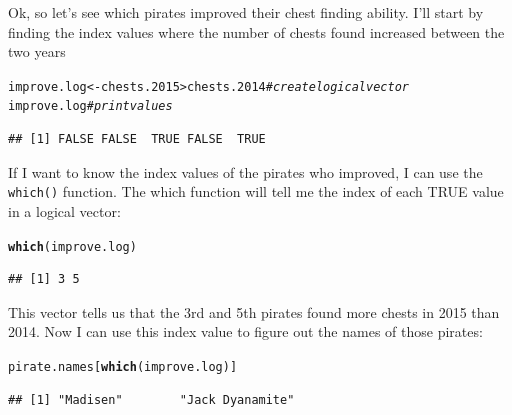 \documentclass{tufte-book}\usepackage[]{graphicx}\usepackage[]{color}
\makeatletter
\newcommand{\hlcom}[1]{\textcolor[rgb]{0.678,0.584,0.686}{\textit{#1}}}%
\newcommand{\hlopt}[1]{\textcolor[rgb]{0,0,0}{#1}}%
\newcommand{\hlstd}[1]{\textcolor[rgb]{0.345,0.345,0.345}{#1}}%
\newcommand{\hlkwb}[1]{\textcolor[rgb]{0.69,0.353,0.396}{#1}}%
\newcommand{\hlkwd}[1]{\textcolor[rgb]{0.737,0.353,0.396}{\textbf{#1}}}%
\newenvironment{kframe}{%
 \def\at@end@of@kframe{}%
 \ifinner\ifhmode%
  \def\at@end@of@kframe{\end{minipage}}%
  \begin{minipage}{\columnwidth}%
 \fi\fi%
 \def\FrameCommand##1{\hskip\@totalleftmargin \hskip-\fboxsep
 \colorbox{shadecolor}{##1}\hskip-\fboxsep
     \hskip-\linewidth \hskip-\@totalleftmargin \hskip\columnwidth}%
 \MakeFramed {\advance\hsize-\width
   \@totalleftmargin\z@ \linewidth\hsize
   \@setminipage}}%
 {\par\unskip\endMakeFramed%
 \at@end@of@kframe}
\newenvironment{knitrout}{}{} %
\makeatother
\begin{document}
\begin{footnotesize}
Ok, so let's see which pirates improved their chest finding ability. I'll start by finding the index values where the number of chests found increased between the two years

\begin{footnotesize}
\begin{knitrout}
\color{fgcolor}\begin{kframe}
\begin{alltt}
\hlstd{improve.log} \hlkwb{<-} \hlstd{chests.2015} \hlopt{>} \hlstd{chests.2014} \hlcom{# create logical vector}
\hlstd{improve.log} \hlcom{# print values}
\end{alltt}
\begin{verbatim}
## [1] FALSE FALSE  TRUE FALSE  TRUE
\end{verbatim}
\end{kframe}
\end{knitrout}
\end{footnotesize}

If I want to know the index values of the pirates who improved, I can use the \texttt{which()} function. The which function will tell me the index of each TRUE value in a logical vector:

\begin{footnotesize}
\begin{knitrout}
\color{fgcolor}\begin{kframe}
\begin{alltt}
\hlkwd{which}\hlstd{(improve.log)}
\end{alltt}
\begin{verbatim}
## [1] 3 5
\end{verbatim}
\end{kframe}
\end{knitrout}
\end{footnotesize}

This vector tells us that the 3rd and 5th pirates found more chests in 2015 than 2014. Now I can use this index value to figure out the names of those pirates:

\begin{footnotesize}
\begin{knitrout}
\color{fgcolor}\begin{kframe}
\begin{alltt}
\hlstd{pirate.names[}\hlkwd{which}\hlstd{(improve.log)]}
\end{alltt}
\begin{verbatim}
## [1] "Madisen"        "Jack Dyanamite"
\end{verbatim}
\end{kframe}
\end{knitrout}
\end{footnotesize}



\end{footnotesize}
\end{document}
